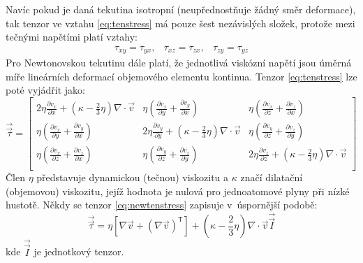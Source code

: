 \noindent  Navíc pokud je daná tekutina isotropní (neupřednostňuje žádný směr deformace), tak tenzor ve vztahu \ref{eq:tenstress} má pouze šest nezávislých složek, protože mezi tečnými napětími platí vztahy:
\begin{equation}
    \begin{array}{ccc}
      \tau_{xy} = \tau_{yx}, & \tau_{xz} = \tau_{zx}, & \tau_{zy} = \tau_{yz}
      \end{array}
  	\label{eq:dept}
\end{equation} 
Pro Newtonovskou tekutinu dále platí, že jednotlivá viskózní napětí jsou úměrná míře lineárních deformací objemového elementu kontinua. Tenzor \ref{eq:tenstress} lze poté vyjádřit jako: 
\begin{equation}
    \vec{\vec{\tau}} = 
    \begin{bmatrix}
      2\eta\frac{\partial v_{x}}{\partial x} + \left( \kappa - \frac{2}{3} \eta  \right)  \nabla \cdot \vec{v} & \eta \left( \frac{\partial v_{x}}{\partial y} + \frac{\partial v_{y}}{\partial x} \right) & \eta \left( \frac{\partial v_{x}}{\partial z} + \frac{\partial v_{z}}{\partial x} \right)\\ 
      \eta \left( \frac{\partial v_{x}}{\partial y} + \frac{\partial v_{y}}{\partial x} \right) & 2\eta\frac{\partial v_{y}}{\partial y} + \left( \kappa - \frac{2}{3} \eta  \right)  \nabla \cdot \vec{v} 
      & \eta \left( \frac{\partial v_{y}}{\partial z} + \frac{\partial v_{z}}{\partial y} \right)\\ 
      \eta \left( \frac{\partial v_{x}}{\partial z} + \frac{\partial v_{z}}{\partial x} \right) & \eta \left( \frac{\partial v_{y}}{\partial z} + \frac{\partial v_{z}}{\partial y} \right)
      & 2\eta\frac{\partial v_{z}}{\partial z} + \left( \kappa - \frac{2}{3} \eta  \right) \nabla \cdot \vec{v}\\ 
    \end{bmatrix}
  	\label{eq:newtenstress}
\end{equation} 
Člen $\eta$ představuje dynamickou (tečnou) viskozitu a $\kappa$ značí dilatační (objemovou) viskozitu, jejíž hodnota je nulová pro jednoatomové plyny při nízké hustotě. Někdy se tenzor \ref{eq:newtenstress} zapisuje v~úspornější podobě:
\begin{equation}
	\vec{\vec{\tau}} = \eta \left[ \nabla \vec{v} +  \left( \nabla \vec{v} \right)^{\mathsf{T}}\right] +  \left( \kappa -\frac{2}{3} \eta \right) \nabla \cdot \vec{v} \vec{\vec{I}}
	\label{eq:comptenstress}
\end{equation}
kde $\vec{\vec{I}}$ je jednotkový tenzor.

